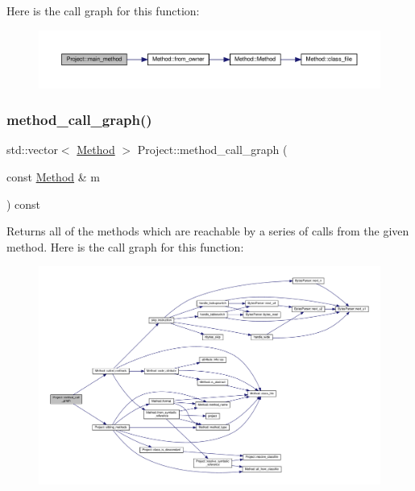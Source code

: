 Here is the call graph for this function\+:
\nopagebreak
\begin{figure}[H]
\begin{center}
\leavevmode
\includegraphics[width=350pt]{classProject_a8122de9e7b4bc2a63e1391727c881474_cgraph}
\end{center}
\end{figure}
\mbox{\label{classProject_ac4d866eaedfd1083d4736530382c7b7c}} 
\subsubsection{\texorpdfstring{method\+\_\+call\+\_\+graph()}{method\_call\_graph()}}
{\footnotesize\ttfamily std\+::vector$<$ \hyperlink{classMethod}{Method} $>$ Project\+::method\+\_\+call\+\_\+graph (\begin{DoxyParamCaption}\item[{const \hyperlink{classMethod}{Method} \&}]{m }\end{DoxyParamCaption}) const}

Returns all of the methods which are reachable by a series of calls from the given method. Here is the call graph for this function\+:
\nopagebreak
\begin{figure}[H]
\begin{center}
\leavevmode
\includegraphics[width=350pt]{classProject_ac4d866eaedfd1083d4736530382c7b7c_cgraph}
\end{center}
\end{figure}
\mbox{\label{classProject_af5f35c59d1175af1cfa659a597bb6353}} 
